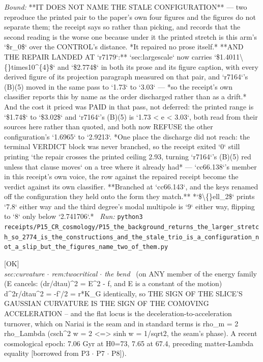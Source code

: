 \begin{description}
 \emph{Bound:}  **IT DOES NOT NAME THE STALE CONFIGURATION** --- two reproduce the printed pair to the paper's own four figures and the figures do not separate them; the receipt says so rather than picking, and records that the second reading is the worse one because under it the printed stretch is this arm's `\$r\_0\$` over the CONTROL's distance.  *It repaired no prose itself.*  **AND THE REPAIR LANDED AT `r7179`:** `sec:largescale` now carries `\$1.4011\textbackslash\{\}times10\textasciicircum{}\{4\}\$` and `\$2.774\$` in both its prose and its figure caption, with every derived figure of its projection paragraph measured on that pair, and `r7164`'s (B)(5) moved in the same pass to `1.73` to `3.03` --- *so the receipt's own classifier reports this by name as the order discharged rather than as a drift.*  And the cost it priced was PAID in that pass, not deferred: the printed range is `\$1.74\$` to `\$3.02\$` and `r7164`'s (B)(5) is `1.73 < e < 3.03`, both read from their sources here rather than quoted, and both now REFUSE the other configuration's `1.6965` to `2.9213`.  *One place the discharge did not reach: the terminal VERDICT block was never branched, so the receipt exited `0` still printing `the repair crosses the printed ceiling 2.93, turning `r7164`'s (B)(5) red unless that clause moves` on a tree where it already had* --- `cc66.138`'s member in this receipt's own voice, the row against the repaired receipt become the verdict against its own classifier. **Branched at `cc66.143`, and the keys renamed off the configuration they held onto the form they match.** *`\$\textbackslash\{\}ell\_2\$` prints `7.8` either way and the third degree's modal multipole is `9` either way, flipping to `8` only below `2.741706`.*
\ \emph{Run:} \texttt{python3 receipts/P15\_CR\_cosmology/P15\_the\_background\_returns\_the\_larger\_stretch\_so\_2774\_is\_the\_constructions\_and\_the\_stale\_trio\_is\_a\_configuration\_not\_a\_slip\_but\_the\_figures\_name\_two\_of\_them.py}
\item[\rcptlabel{P03_acceleration_is_slice_curvature}{P3R12}\textbf{P3R12}\quad\texttt{P03\_acceleration\_is\_slice\_curvature}]\hfill\textsf{[OK]}\\
\textit{sec:curvature \ensuremath{\cdot} rem:twocritical \ensuremath{\cdot} the bend} \ (on ANY member of the energy family (E cancels: (dr/dtau)\textasciicircum{}2 = E\textasciicircum{}2 - f, and E is a constant of the motion) d\textasciicircum{}2r/dtau\textasciicircum{}2 = -f'/2 = r*K\_G identically, so THE SIGN OF THE SLICE'S GAUSSIAN CURVATURE IS THE SIGN OF THE COMOVING ACCELERATION -- and the flat locus is the deceleration-to-acceleration turnover, which on Nariai is the seam and in standard terms is rho\_m = 2 rho\_Lambda (csch\textasciicircum{}2 w = 2 <=> sinh w = 1/sqrt2, the seam's phase). A recent cosmological epoch: 7.06 Gyr at H0=73, 7.65 at 67.4, preceding matter-Lambda equality [borrowed from P3 \ensuremath{\cdot} P7 \ensuremath{\cdot} P8]). 

\end{description}
